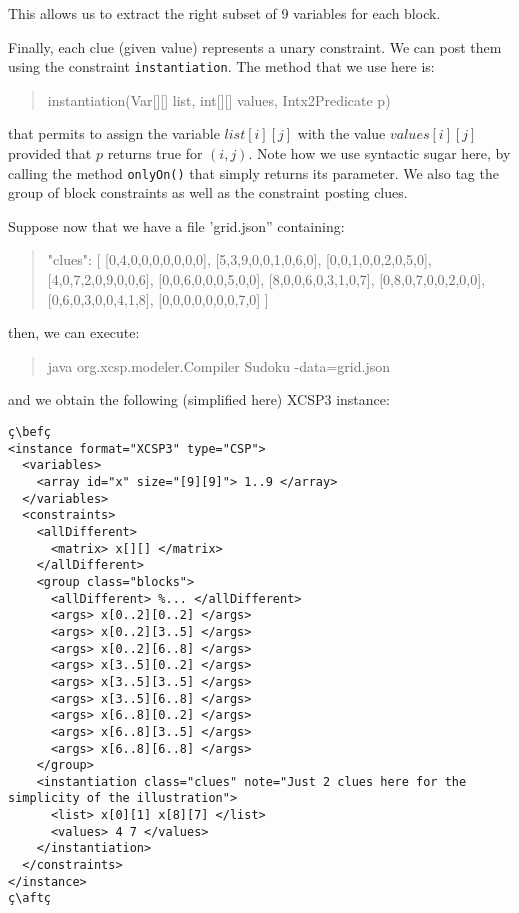 \documentclass[10pt]{article}
\def\xt{{\rm XCSP3}\xspace}
\newcommand{\gb}[1]{{\tt #1}} %
\newcommand{\nn}[1]{{\tt #1}} %
\def\xt{{\rm XCSP3}\xspace}
\newenvironment{myvb}{\endgraf\small\verbatim}{\endverbatim}
\def\bef{\rule{10cm}{0.1mm}} %
\def\aft{\rule{10cm}{0.1mm}\medskip}
\begin{document}
This allows us to extract the right subset of 9 variables for each block.

Finally, each clue (given value) represents a unary constraint.
We can post them using the constraint \gb{instantiation}.
The method that we use here is:

\begin{quote}
\begin{myvb}
instantiation(Var[][] list, int[][] values, Intx2Predicate p) 
\end{myvb}
\end{quote}
that permits to assign the variable $list[i][j]$ with the value $values[i][j]$ provided that $p$ returns true for $(i,j)$.
Note how we use syntactic sugar here, by calling the method \nn{onlyOn()} that simply returns its parameter.
We also tag the group of block constraints as well as the constraint posting clues.


Suppose now that we have a file 'grid.json'' containing:
\begin{quote}
\begin{myvb}
{
  "clues": [
    [0,4,0,0,0,0,0,0,0],
    [5,3,9,0,0,1,0,6,0],
    [0,0,1,0,0,2,0,5,0],
    [4,0,7,2,0,9,0,0,6],
    [0,0,6,0,0,0,5,0,0],
    [8,0,0,6,0,3,1,0,7],
    [0,8,0,7,0,0,2,0,0],
    [0,6,0,3,0,0,4,1,8],
    [0,0,0,0,0,0,0,7,0]
  ]
}
\end{myvb}
\end{quote}
then, we can execute:
\begin{quote}
\begin{myvb}
java org.xcsp.modeler.Compiler Sudoku -data=grid.json
\end{myvb}
\end{quote}
and we obtain the following (simplified here) \xt instance:
\begin{lstlisting}
ç\befç
<instance format="XCSP3" type="CSP">
  <variables>
    <array id="x" size="[9][9]"> 1..9 </array>
  </variables>
  <constraints>
    <allDifferent>
      <matrix> x[][] </matrix>
    </allDifferent>
    <group class="blocks">
      <allDifferent> %... </allDifferent>
      <args> x[0..2][0..2] </args>
      <args> x[0..2][3..5] </args>
      <args> x[0..2][6..8] </args>
      <args> x[3..5][0..2] </args>
      <args> x[3..5][3..5] </args>
      <args> x[3..5][6..8] </args>
      <args> x[6..8][0..2] </args>
      <args> x[6..8][3..5] </args>
      <args> x[6..8][6..8] </args>
    </group>
    <instantiation class="clues" note="Just 2 clues here for the simplicity of the illustration">
      <list> x[0][1] x[8][7] </list>
      <values> 4 7 </values>
    </instantiation>
  </constraints>
</instance>
ç\aftç
\end{lstlisting}
\end{document}

